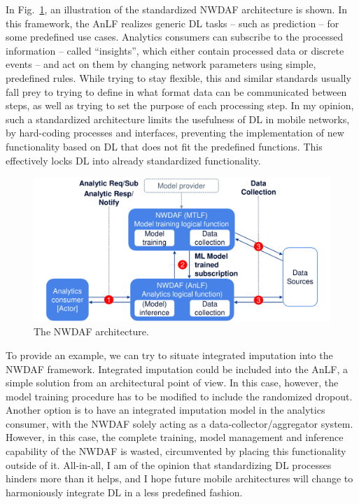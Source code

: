 			In Fig.~\ref{fig:nwdaf}, an illustration of the standardized \ac{NWDAF} architecture is shown.
			In this framework, the \ac{AnLF} realizes generic \ac{DL} tasks -- such as prediction -- for some predefined use cases.
			Analytics consumers can subscribe to the processed information -- called ``insights'', which either contain processed data or discrete events -- and act on them by changing network parameters using simple, predefined rules.
			While trying to stay flexible, this and similar standards usually fall prey to trying to define in what format data can be communicated between steps, as well as trying to set the purpose of each processing step.
			In my opinion, such a standardized architecture limits the usefulness of \ac{DL} in mobile networks, by hard-coding processes and interfaces, preventing the implementation of new functionality based on \ac{DL} that does not fit the predefined functions.
			This effectively locks \ac{DL} into already standardized functionality.
			
			\begin{figure}[ht]
				\centering
				\includegraphics[width=0.8\linewidth]{figures/12_imputation/nwdaf/nwdaf.pdf}
				\caption[NWDAF architecture]{The NWDAF architecture.}
				\label{fig:nwdaf}
			\end{figure}
			
			To provide an example, we can try to situate integrated imputation into the \ac{NWDAF} framework.
			Integrated imputation could be included into the \ac{AnLF}, a simple solution from an architectural point of view.
			In this case, however, the model training procedure has to be modified to include the randomized dropout.
			Another option is to have an integrated imputation model in the analytics consumer, with the \ac{NWDAF} solely acting as a data-collector/aggregator system.
			However, in this case, the complete training, model management and inference capability of the \ac{NWDAF} is wasted, circumvented by placing this functionality outside of it.
			All-in-all, I am of the opinion that standardizing \ac{DL} processes hinders more than it helps, and I hope future mobile architectures will change to harmoniously integrate \ac{DL} in a less predefined fashion.

